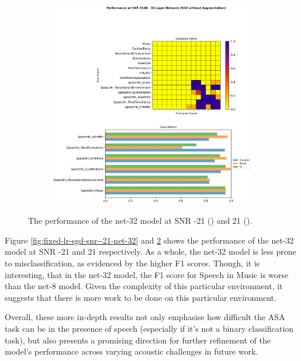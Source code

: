 \documentclass[logo,bsc,singlespacing,parskip,online]{infthesis}
\begin{document}
\begin{figure}[h]
\begin{subfigure}[b]{0.48\textwidth}
      \includegraphics[width=\textwidth]{net-32/FIXED-fixed-lr-sgd/snr_21_performance.png}
      \caption{}
      \label{fig:fixed-lr-sgd-snr-21-net-32}
   \end{subfigure}
   \caption{The performance of the net-32 model at SNR -21 () and 21 ().}
\end{figure}

Figure \ref{fig:fixed-lr-sgd-snr--21-net-32} and \ref{fig:fixed-lr-sgd-snr-21-net-32} shows 
the performance of the net-32 model at SNR -21 and 21 respectively.
As a whole, the net-32 model is less prone to misclassification, 
as evidenced by the higher F1 scores. Though, it is interesting, that in the 
net-32 model, the F1 score for Speech in Music is worse than the net-8 model.
Given the complexity of this particular environment, it suggests that 
there is more work to be done on this particular environment. 

Overall, these more in-depth results not only emphasise 
how difficult the ASA task can be in the presence of speech (especially 
if it's not a binary classification task), but also 
presents a promising direction for further refinement of the model's performance across varying acoustic challenges
in future work.
\end{document}
